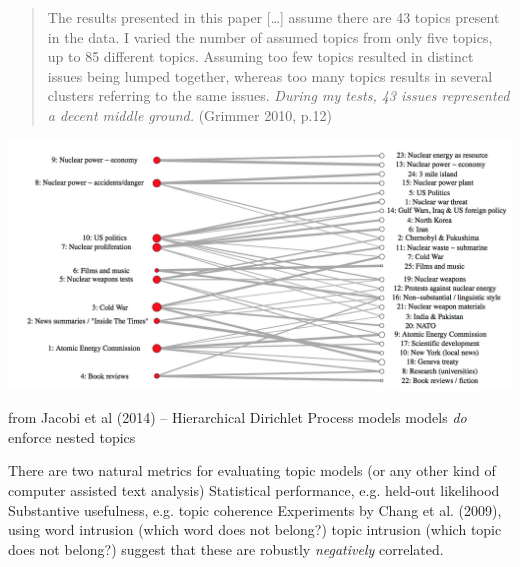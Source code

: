 \documentclass{mediumfoils}
\begin{document}
%
%
%
%
%


{\small
\begin{quote}
The results presented in this paper [\ldots] assume there are 43 topics present in the data. I varied the number of assumed topics from only five topics, up to 85 different topics. Assuming too few topics resulted in distinct issues being lumped together, whereas too many topics results in several clusters referring to the same issues. \textsl{During my tests, 43 issues represented a decent middle ground.} 
(Grimmer 2010, p.12)
\end{quote}
}


\centerline{\includegraphics[scale=.8]{pictures/nested-topics-nuclear}}

from Jacobi et al (2014) -- Hierarchical Dirichlet Process models models \textit{do} enforce nested topics


There are two natural metrics for evaluating topic models (or any other kind of computer assisted text analysis)
\ita
\itm Statistical performance, e.g. held-out likelihood
\itm Substantive usefulness, e.g. topic coherence
\itz
Experiments by Chang et al. (2009), using
\ita
\itm word intrusion (which word does not belong?)
\itm topic intrusion (which topic does not belong?)
\itz
suggest that these are robustly \textit{negatively} correlated.
\end{document}
